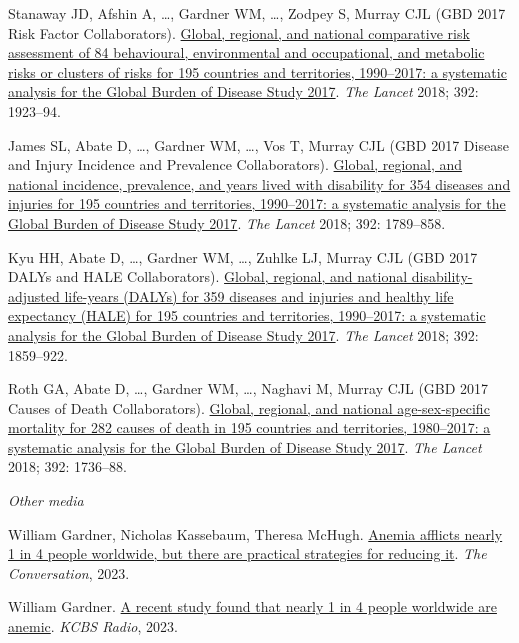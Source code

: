 \documentclass[11pt,article,oneside]{memoir}
\begin{document}
\begin{publist}
\item Stanaway JD, Afshin A, \ldots, {\minbold Gardner WM}, \ldots, Zodpey S, Murray CJL (GBD 2017 Risk Factor Collaborators). \href{https://doi.org/10.1016/S0140-6736(18)32225-6}{Global, regional, and national comparative risk assessment of 84 behavioural, environmental and occupational, and metabolic risks or clusters of risks for 195 countries and territories, 1990--2017: a systematic analysis for the Global Burden of Disease Study 2017}. \emph{The Lancet} 2018; 392: 1923--94.

\item James SL, Abate D, \ldots, {\minbold Gardner WM}, \ldots, Vos T, Murray CJL (GBD 2017 Disease and Injury Incidence and Prevalence Collaborators). \href{https://doi.org/10.1016/S0140-6736(18)32279-7}{Global, regional, and national incidence, prevalence, and years lived with disability for 354 diseases and injuries for 195 countries and territories, 1990--2017: a systematic analysis for the Global Burden of Disease Study 2017}. \emph{The Lancet} 2018; 392: 1789--858.

\item Kyu HH, Abate D, \ldots, {\minbold Gardner WM}, \ldots, Zuhlke LJ, Murray CJL (GBD 2017 DALYs and HALE Collaborators). \href{https://doi.org/10.1016/S0140-6736(18)32335-3}{Global, regional, and national disability-adjusted life-years (DALYs) for 359 diseases and injuries and healthy life expectancy (HALE) for 195 countries and territories, 1990--2017: a systematic analysis for the Global Burden of Disease Study 2017}. \emph{The Lancet} 2018; 392: 1859--922.

\item Roth GA, Abate D, \ldots, {\minbold Gardner WM}, \ldots, Naghavi M, Murray CJL (GBD 2017 Causes of Death Collaborators). \href{https://doi.org/10.1016/S0140-6736(18)32203-7}{Global, regional, and national age-sex-specific mortality for 282 causes of death in 195 countries and territories, 1980--2017: a systematic analysis for the Global Burden of Disease Study 2017}. \emph{The Lancet} 2018; 392: 1736--88.

\end{publist}

\bigskip
\noindent\emph{Other media \vspace{0.05in}}

\begin{publist}

\item {\minbold William Gardner}, Nicholas Kassebaum, Theresa McHugh. \href{https://theconversation.com/anemia-afflicts-nearly-1-in-4-people-worldwide-but-there-are-practical-strategies-for-reducing-it-212177}{ 
Anemia afflicts nearly 1 in 4 people worldwide, but there are practical strategies for reducing it}. \emph{The Conversation}, 2023.

\item {\minbold William Gardner}. \href{https://omny.fm/shows/kcbsam-on-demand/a-recent-study-found-that-nearly-1-in-four-people}{
	A recent study found that nearly 1 in 4 people worldwide are anemic}. \emph{KCBS Radio}, 2023.

\end{publist}
\end{document}
